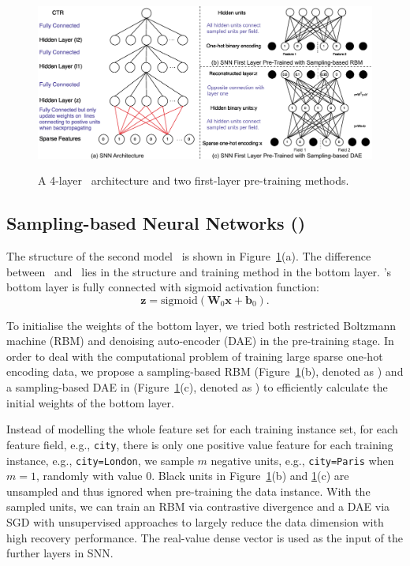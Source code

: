 \documentclass{llncs}
\newcommand{\bs}{\boldsymbol}
\newcommand{\sigmoid}{\text{sigmoid}}
\newcommand{\ft}{\texttt}
\newcommand{\fmnn}{\text{FNN}}
\newcommand{\snn}{\text{SNN}}
\newcommand{\snnrbm}{\text{SNN-RBM}}
\newcommand{\snndae}{\text{SNN-DAE}}
\begin{document}
\begin{figure}[t]
  \centering
  \vspace{-35pt}
  \includegraphics[width=1.1\columnwidth]{figs/ssn3}\\
  \caption{A 4-layer \snn~architecture and two first-layer pre-training methods.}\label{fig:snn}
\end{figure}

\subsection{Sampling-based Neural Networks (\snn)}\label{sec:snn}
The structure of the second model \snn~is shown in Figure~\ref{fig:snn}(a). The difference between \snn~and \fmnn~lies in the structure and training method in the bottom layer. \snn's bottom layer is fully connected with sigmoid activation function:
\begin{equation}
\bs{z}=\sigmoid(\bs{W}_{0}\bs{x}+\bs{b}_{0}).   \label{eq:defmodtwo}
\end{equation}

To initialise the weights of the bottom layer, we tried both restricted Boltzmann machine (RBM) \cite{hinton2010practical} and denoising auto-encoder (DAE) \cite{bengio2013generalized} in the pre-training stage. In order to deal with the computational problem of training large sparse one-hot encoding data, we propose a sampling-based RBM (Figure~\ref{fig:snn}(b), denoted as \snnrbm) and a sampling-based DAE in (Figure~\ref{fig:snn}(c), denoted as \snndae) to efficiently calculate the initial weights of the bottom layer.

Instead of modelling the whole feature set for each training instance set, for each feature field, e.g., \ft{city}, there is only one positive value feature for each training instance, e.g., \ft{city=London}, we sample $m$ negative units, e.g., \ft{city=Paris} when $m=1$, randomly with value 0. Black units in Figure~\ref{fig:snn}(b) and \ref{fig:snn}(c) are unsampled and thus ignored when pre-training the data instance. With the sampled units, we can train an RBM via contrastive divergence \cite{hinton2002training} and a DAE via SGD with unsupervised approaches to largely reduce the data dimension with high recovery performance. The real-value dense vector is used as the input of the further layers in SNN.
\end{document}
